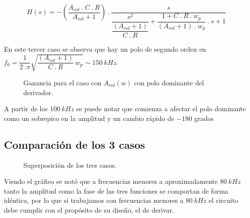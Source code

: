 \documentclass[11pt, a4paper]{article}
\begin{document}
\begin{equation}
H(s) = - \left( \dfrac{A_{vol} \ . \ C \ . \ R}{A_{vol} + 1} \right) \ . \ \dfrac{s}{ \dfrac{s^2}{\dfrac{(A_{vol}+1)}{C \ . \ R}} + \dfrac{1+ C \ . \ R \ . \ w_p}{(A_{vol} + 1) \ . \ w_p} \ . \ s + 1} 
\end{equation}

En este tercer caso se observa que hay un polo de segundo orden en $f_0 = \dfrac{1}{2 \ . \pi} \sqrt{\dfrac{(A_{vol}+1)}{C \ . \ R} \ w_p} \sim 150 \ kHz$.

\begin{figure}[h!]
	\begin{center}
		\label{avolpolodominantederivador}
		\caption{Ganancia para el caso con $A_{vol}(w)$ con polo dominante del derivador.}
	\end{center}
\end{figure}

A partir de los $100 \ kHz$ se puede notar que comienza a afectar el polo dominante como un sobrepico en la amplitud y un cambio rápido de $-180$ grados

\subsection{Comparación de los 3 casos}
\begin{figure}[h!]
	\begin{center}
		\label{avolpolodominante}
		\caption{Superposición de los tres casos.}
	\end{center}
\end{figure}
Viendo el gráfico se notó que a frecuencias menores a aproximadamente $80 \ kHz$ tanto la amplitud como la fase de las tres funciones se comportan de forma idéntica, por lo que si trabajamos con frecuencias menores a $80 \ kHz$ el circuito debe cumplir con el propósito de su diseño, el de derivar.
\end{document}
